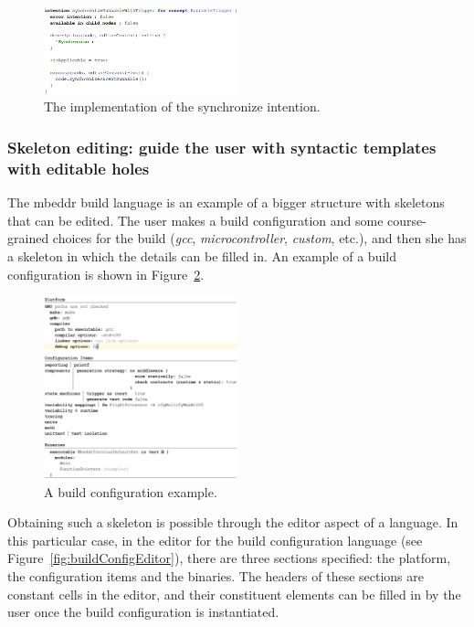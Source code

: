 \documentclass[preprint,numbers,10pt]{sigplanconf}
\begin{document}
\begin{figure}[H]
	\centering
	\includegraphics[width=0.50\textwidth]{screens/synchronizeRunnableWithTrigger.png}
	\caption{The implementation of the synchronize intention.}
	\label{fig:synchronizeRunnable}
\end{figure}
\subsubsection{Skeleton editing: guide the user with syntactic templates with editable holes}
The mbeddr build language is an example of a bigger structure with skeletons that can be edited.
The user makes a build configuration and some course-grained choices for the build (\emph{gcc}, \emph{microcontroller}, \emph{custom}, etc.),
and then she has a skeleton in which the details can be filled in. An example of a build configuration is shown in Figure~\ref{fig:buildConfigExample}.

\begin{figure}[H]
	\centering
	\includegraphics[width=0.50\textwidth]{screens/BuildConfigExample.png}
	\caption{A build configuration example.}
	\label{fig:buildConfigExample}
\end{figure}

Obtaining such a skeleton is possible through the editor aspect of a language. In this particular case,
in the editor for the build configuration language (see Figure~\ref{fig:buildConfigEditor}), there are three
sections specified: the platform, the configuration items and the binaries. The headers of these sections
are constant cells in the editor, and their constituent elements can be filled in by the user once the
build configuration is instantiated.
\end{document}
